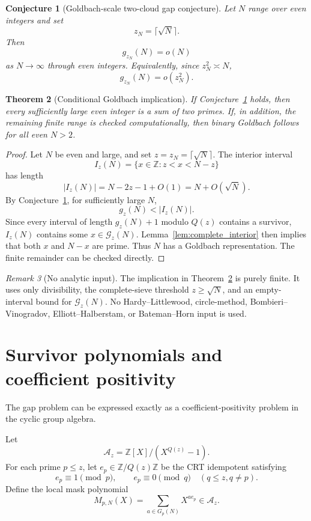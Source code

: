\documentclass[11pt]{article}
\theoremstyle{plain}
\newtheorem{theorem}{Theorem}[section]
\newtheorem{conjecture}[theorem]{Conjecture}
\theoremstyle{definition}
\theoremstyle{remark}
\newtheorem{remark}[theorem]{Remark}
\newcommand{\Z}{\mathbb Z}
\newcommand{\G}{\mathcal G}
\newcommand{\A}{\mathcal A}
\begin{document}
\begin{conjecture}[Goldbach-scale two-cloud gap conjecture]
\label{conj:subquadratic}
Let \(N\) range over even integers and set
\[
z_N=\lceil\sqrt N\rceil.
\]
Then
\[
g_{z_N}(N)=o(N)
\]
as \(N\to\infty\) through even integers.  Equivalently, since
\(z_N^2\asymp N\),
\[
g_{z_N}(N)=o(z_N^2).
\]
\end{conjecture}

\begin{theorem}[Conditional Goldbach implication]
\label{thm:conditional_goldbach}
If Conjecture~\ref{conj:subquadratic} holds, then every sufficiently large even
integer is a sum of two primes.  If, in addition, the remaining finite range is
checked computationally, then binary Goldbach follows for all even \(N>2\).
\end{theorem}

\begin{proof}
Let \(N\) be even and large, and set \(z=z_N=\lceil\sqrt N\rceil\).  The interior
interval
\[
I_z(N)=\{x\in\Z:z<x<N-z\}
\]
has length
\[
|I_z(N)|=N-2z-1+O(1)=N+O(\sqrt N).
\]
By Conjecture~\ref{conj:subquadratic}, for sufficiently large \(N\),
\[
g_z(N)<|I_z(N)|.
\]
Since every interval of length \(g_z(N)+1\) modulo \(Q(z)\) contains a survivor,
\(I_z(N)\) contains some \(x\in\G_z(N)\).  Lemma~\ref{lem:complete_interior}
then implies that both \(x\) and \(N-x\) are prime.  Thus \(N\) has a Goldbach
representation.  The finite remainder can be checked directly.
\end{proof}

\begin{remark}[No analytic input]
The implication in Theorem~\ref{thm:conditional_goldbach} is purely finite.  It
uses only divisibility, the complete-sieve threshold \(z\ge\sqrt N\), and an
empty-interval bound for \(\G_z(N)\).  No Hardy--Littlewood, circle-method,
Bombieri--Vinogradov, Elliott--Halberstam, or Bateman--Horn input is used.
\end{remark}

\section{Survivor polynomials and coefficient positivity}
\label{sec:poly}

The gap problem can be expressed exactly as a coefficient-positivity problem in
the cyclic group algebra.

Let
\[
\A_z=\Z[X]/(X^{Q(z)}-1).
\]
For each prime \(p\le z\), let \(e_p\in\Z/Q(z)\Z\) be the CRT idempotent
satisfying
\[
e_p\equiv1\pmod p,
\qquad
 e_p\equiv0\pmod q\quad(q\le z,
q\ne p).
\]
Define the local mask polynomial
\[
M_{p,N}(X)=\sum_{a\in G_p(N)}X^{a e_p}\in\A_z.
\]
\end{document}
